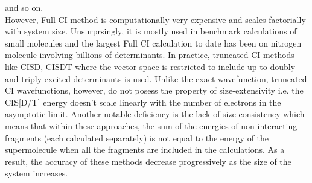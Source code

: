 and so on.\\
However, Full CI method is computationally very expensive and scales factorially with 
system size. Unsurprsingly, it is mostly used in benchmark calculations of small molecules and
the largest Full CI calculation to date has been on nitrogen molecule\cite{} involving 
billions of determinants. In practice, truncated CI methods like CISD, CISDT where the vector 
space is restricted to include up to doubly and triply excited determinants 
is used. Unlike the exact wavefunction, truncated CI wavefunctions, however, 
do not posess the property of size-extensivity i.e. the CIS[D/T] energy doesn't scale 
linearly with the number of electrons in the asymptotic limit. Another notable deficiency 
is the lack of size-consistency which means that within these approaches, the sum of the 
energies of non-interacting fragments (each calculated separately) is not equal to the energy 
of the supermolecule when all the fragments are included in the calculations.
As a result, the accuracy of these methods decrease progressively as the size of the system increases.
